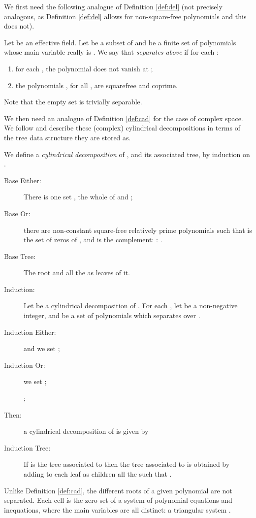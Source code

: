 \documentclass[runningheads,a4paper]{llncs}
\begin{document}
We first need the following analogue of Definition \ref{def:del} (not precisely analogous, as Definition \ref{def:del} allows for non-square-free polynomials and this does not).
\begin{definition}\label{def:sep}Let  be an effective field.
Let  be a subset of  and  be a finite set of polynomials whose main variable really is . We say that  \emph{separates above}  if for each :
\begin{enumerate}
\item for each , the polynomial  does not vanish at ;
\item the polynomials , for all , are squarefree and coprime.
\end{enumerate}
Note that the empty set is trivially separable.
\end{definition}
\def\cD{{\cal D}}
We then need an analogue of Definition \ref{def:cad} for the case of complex space.  We follow \cite{ChenMorenoMaza2012a} and describe these (complex) cylindrical decompositions in terms of the tree data structure they are stored as.
\begin{definition}\label{def:ccd}
We define a \emph{cylindrical decomposition} of , and its associated tree, by induction on .
\begin{description}
\item[Base Either:] There is one set , the whole of  and ;
\item[Base Or:] there are  non-constant square-free relatively prime polynomials  such that  is the set of zeros of , and  is the complement: : .
\item[Base Tree:] The root and all the  as leaves of it.
\item[Induction:] Let  be a cylindrical decomposition of . For each , let  be a non-negative integer, and  be a set of polynomials which separates over . 
\item[Induction Either:]  and we set ;
\item[Induction Or:] we set ; 
\item[\qquad\quad];
\item[Then:] a cylindrical decomposition of  is given by

\item[Induction Tree:] If  is the tree associated to  then the tree associated to  is obtained by adding to each leaf  as children all the  such that .
\end{description}
\rm Unlike Definition \ref{def:cad}, the different roots of a given polynomial are not separated. Each cell is the zero set of a system of polynomial equations and inequations, where the main variables are all distinct: a triangular system \cite{Aubryetal1999}.
\end{definition}
\end{document}
